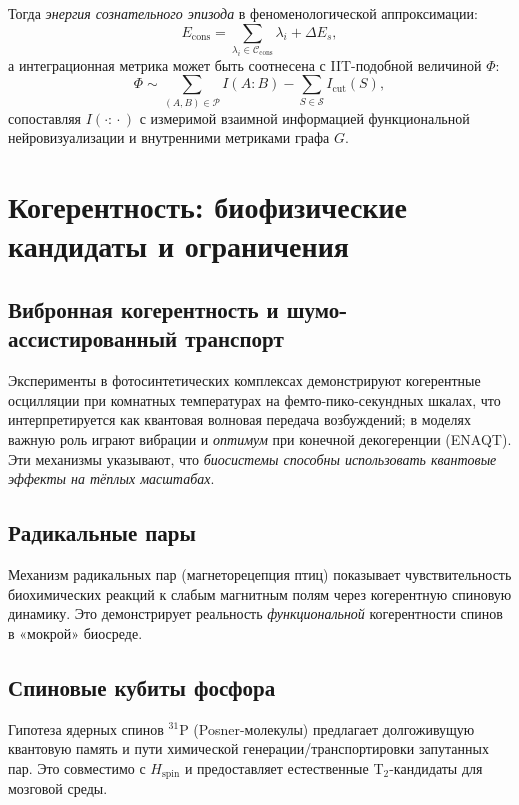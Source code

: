 \documentclass[12pt,a4paper]{article}
\begin{document}
Тогда \emph{энергия сознательного эпизода} в феноменологической аппроксимации:
\begin{equation}
E_{\text{cons}} = \sum_{\lambda_i \in \mathcal{C}_{\text{cons}}} \lambda_i + \Delta E_s,
\end{equation}
а интеграционная метрика может быть соотнесена с IIT-подобной величиной $\Phi$:
\begin{equation}
\Phi \sim \sum_{(A,B)\in \mathcal{P}} I(A\!:\!B) - \sum_{S\in \mathcal{S}} I_{\text{cut}}(S),
\end{equation}
сопоставляя $I(\cdot\!:\!\cdot)$ с измеримой взаимной информацией функциональной нейровизуализации и внутренними метриками графа $G$.

\section{Когерентность: биофизические кандидаты и ограничения}
\subsection{Вибронная когерентность и шумо-ассистированный транспорт}
Эксперименты в фотосинтетических комплексах демонстрируют когерентные осцилляции при комнатных температурах на фемто-пико-секундных шкалах, что интерпретируется как квантовая волновая передача возбуждений; в моделях важную роль играют вибрации и \emph{оптимум} при конечной декогеренции (ENAQT). Эти механизмы указывают, что \emph{биосистемы способны использовать квантовые эффекты на тёплых масштабах}. 

\subsection{Радикальные пары}
Механизм радикальных пар (магнеторецепция птиц) показывает чувствительность биохимических реакций к слабым магнитным полям через когерентную спиновую динамику. Это демонстрирует реальность \emph{функциональной} когерентности спинов в «мокрой» биосреде.

\subsection{Спиновые кубиты фосфора}
Гипотеза ядерных спинов $^{31}$P (Posner-молекулы) предлагает долгоживущую квантовую память и пути химической генерации/транспортировки запутанных пар. Это совместимо с $H_{\text{spin}}$ и предоставляет естественные T$_2$-кандидаты для мозговой среды.
\end{document}
